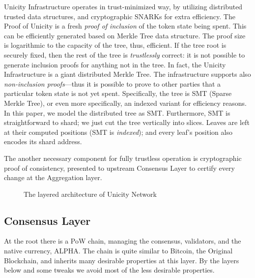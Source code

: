 \documentclass{llncs}
\begin{document}
Unicity Infrastructure operates in trust-minimized way, by utilizing distributed trusted data structures, and cryptographic SNARKs for extra efficiency. The Proof of Unicity is a fresh \emph{proof of inclusion} of the token state being spent. This can be efficiently generated based on Merkle Tree data structure. The proof size is logarithmic to the capacity of the tree, thus, efficient. If the tree root is securely fixed, then the rest of the tree is \textit{trustlessly} correct: it is not possible to generate inclusion proofs for anything not in the tree. In fact, the Unicity Infrastructure is a giant distributed Merkle Tree. The infrastructure supports also \textit{non-inclusion proofs}---thus it is possible to prove to other parties that a particular token state is not yet spent. Specifically, the tree is SMT (Sparse Merkle Tree), or even more specifically, an indexed variant for efficiency reasons. In this paper, we model the distributed tree as SMT. Furthermore, SMT is straightforward to shard; we just cut the tree vertically into slices. Leaves are left at their computed positions (SMT is \emph{indexed}); and every leaf's position also encodes its shard address.

The another necessary component for fully trustless operation is cryptographic proof of consistency, presented to upstream Consensus Layer to certify every change at the Aggregation layer.

\begin{figure}[!htbp]
    \begin{center}
    \caption{The layered architecture of Unicity Network}\label{fig:layers}
    \end{center}
\end{figure}


\subsection{Consensus Layer}

At the root there is a PoW chain, managing the consensus, validators, and the native currency, ALPHA. The chain is quite similar to Bitcoin, the Original Blockchain, and inherits many desirable properties at this layer. By the layers below and some tweaks we avoid most of the less desirable properties.
\end{document}
